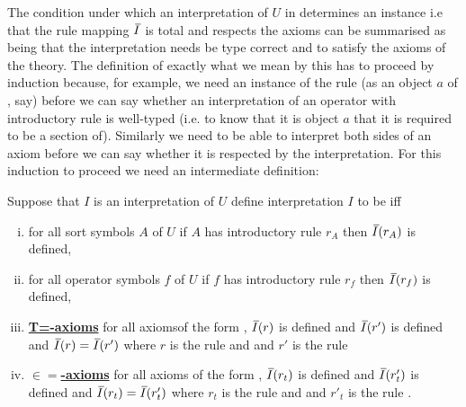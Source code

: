 The condition under which an interpretation of $U$ in \catcw determines an instance i.e that the rule mapping $\Ibar$ is total and respects the axioms can be summarised as being that the interpretation needs be type correct and to satisfy the axioms of the theory. The definition of exactly what we mean by this has to proceed by induction because, for example, we need an instance of the rule
\ZDelta (as an object $a$ of \catc, say) before we can say whether an interpretation of an operator with introductory rule \genericfintroductoryrule
is well-typed (i.e. to know that it is object $a$ that it is required to be a section of).
Similarly we need to be able to interpret both sides of an axiom before we can say whether it is respected
by the interpretation. For this induction to proceed we need an intermediate definition:

\def\restrict{\mathbin{\restriction}}
\newcommand{\predInstance}{\overline{I \restrict U_p}}
\newcommand{\Uincrement}{U \setminus\kern-2pt U_p}

\begin{definition}
 Suppose that $I$ is an interpretation of $U$  
define interpretation $I$ to be   iff 

\begin{enumerate}[(i)]
\item
for all sort symbols $A$ of $U$ if $A$ has introductory rule $r_A$ then $\Ibar(r_A)$ is defined,
\item  
for all operator symbols $f$ of $U$ if $f$ has introductory rule $r_f$ then $\Ibar(r_f)$ is defined,

\item \underline{\textbf{T=-axioms}} 
for all axiomsof the form
 ,
$\Ibar(r)$ is defined and $\Ibar(r')$ is defined and
$\Ibar(r) = \Ibar(r')$ where $r$ is the rule
\ZDelta and  
and $r'$ is the rule \ZDeltap

\item \underline{\textbf{$\boldsymbol{\in=}$-axioms}} 
for all axioms  of the form
,
$\Ibar(r_t)$ is defined and  $\Ibar(r'_t)$ is defined and
$\Ibar(r_t) = \Ibar(r'_t)$ where $r_t$ is the rule
\ZtDelta and  
and $r'_t$ is the rule .
\end{enumerate}
\end{definition}

